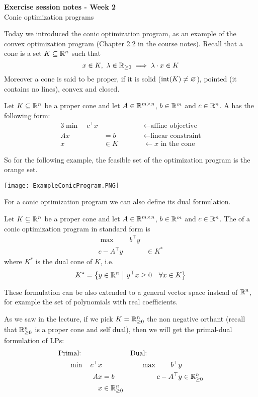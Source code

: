 \documentclass[answers]{exam}
\begin{document}
	$ $
	\begin{center}
		\huge \textbf{Exercise session notes - Week 2}  \\ \vspace*{3mm}
        \Large{Conic optimization programs}
	\end{center}
	$ $\\
    
	Today we introduced the conic optimization program, as an example of the convex optimization program (Chapter 2.2 in the course notes). Recall that a cone is a set $K\subseteq \mathbb{R}^n$ such that  
	$$ x\in K,\ \lambda\in \mathbb{R}_{\geq 0}\implies \lambda\cdot x \in K $$ 
	Moreover a cone is said to be proper, if it is solid ($\operatorname*{int}(K)\neq \varnothing$), pointed (it contains no lines), convex and closed.
	\begin{definition}
		Let $K\subseteq \mathbb{R}^n$ be a proper cone and let $A\in \mathbb{R}^{m\times n}$, $b\in \mathbb{R}^m$ and $c\in \mathbb{R}^n$. A  has the following form:
		\begin{alignat*}{3}
			\min\quad c^{\top} x& && \leftarrow \text{affine objective}\\ 
			Ax &= b &&\leftarrow \text{linear constraint}\\ 
			x&\in K\quad\quad &&\leftarrow \text{$x$ in the cone}
		\end{alignat*}
	\end{definition}	
	So for the following example, the feasible set of the optimization program is the orange set.
	\begin{center}
		\texttt{[image: ExampleConicProgram.PNG]}
	\end{center}
	For a conic optimization program we can also define its dual formulation.
	\begin{definition}
		Let $K\subseteq \mathbb{R}^n$ be a proper cone and let $A\in \mathbb{R}^{m\times n}$, $b\in \mathbb{R}^m$ and $c\in \mathbb{R}^n$. The  of a conic optimization program in standard form is	
		\begin{align*}
			\max\quad\quad b^{\top} y&\\ 
			c- A^\top y &\in K^*
		\end{align*}
		where $K^*$ is the dual cone of $K$, i.e.
		$$ K^* = \left\{y\in \mathbb{R}^n \ \middle|\ y^\top x \geq 0\quad\forall x\in K\right\} $$
	\end{definition}
	These formulation can be also extended to a general vector space instead of $\mathbb{R}^n$, for example the set of polynomials with real coefficients.
	\begin{remark}
		As we saw in the lecture, if we pick $K = \mathbb{R}^n_{\geq 0}$ the non negative orthant (recall that $\mathbb{R}^n_{\geq 0}$ is a proper cone and self dual), then we will get the primal-dual formulation of LPs:
		\begin{align*}
			\text{Primal:} \quad\quad\quad&& \text{Dual:}\quad\quad\quad\quad\quad&\\
			\min\quad c^{\top} x&& \max \quad\quad b^\top y &\\ 
			Ax &= b & c-A^\top y &\in \mathbb{R}_{\geq 0}^n\\
			x &\in \mathbb{R}^n_{\geq 0} & &
		\end{align*}
	\end{remark}
\end{document}
